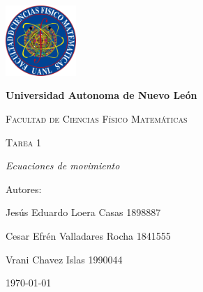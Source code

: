 \begin{titlepage}
    \centering
    {\includegraphics[width=0.2\textwidth]{FCFM.png}\par}
    \vspace{1cm}
    {\bfseries\LARGE Universidad Autonoma de Nuevo León \par}
    \vspace{1cm}
    {\scshape\Large Facultad de Ciencias Físico Matemáticas \par}
    \vspace{3cm}
    {\scshape\Huge Tarea 1  \par}
    \vspace{3cm}
    {\itshape\Large Ecuaciones de movimiento \par}
    \vfill
    {\Large Autores: \par}
    \vfill
    {\Large Jesús Eduardo Loera Casas 1898887 \par}
    \vfill{\Large Cesar Efrén Valladares Rocha 1841555 \par}
    \vfill
    {\Large Vrani Chavez Islas 1990044 \par}
    \vfill
    {\Large \today \par}
\end{titlepage}